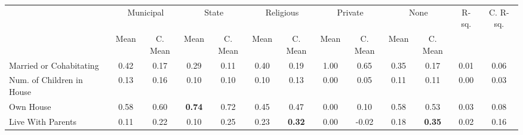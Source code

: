 \begin{tabular}{l c c c c c c c c c c c c}
\toprule
& \multicolumn{2}{c}{Municipal} & \multicolumn{2}{c}{State} & \multicolumn{2}{c}{Religious} & \multicolumn{2}{c}{Private} & \multicolumn{2}{c}{None} & R-sq. & C. R-sq. \\
& \scriptsize Mean & \scriptsize C. Mean & \scriptsize Mean & \scriptsize C. Mean & \scriptsize Mean & \scriptsize C. Mean & \scriptsize Mean & \scriptsize C. Mean & \scriptsize Mean & \scriptsize C. Mean & & \\
\midrule
Married or Cohabitating &      0.42 & 0.17 &      0.29 & 0.11 &      0.40 & 0.19 &      1.00 & 0.65 &      0.35 & 0.17 &      0.01 &      0.06 \\
Num. of Children in House &      0.13 & 0.16 &      0.10 & 0.10 &      0.10 & 0.13 &      0.00 & 0.05 &      0.11 & 0.11 &      0.00 &      0.03 \\
Own House &      0.58 & 0.60 & \textbf{     0.74} & 0.72 &      0.45 & 0.47 &      0.00 & 0.10 &      0.58 & 0.53 &      0.03 &      0.08 \\
Live With Parents &      0.11 & 0.22 &      0.10 & 0.25 &      0.23 & \textbf{     0.32} &      0.00 & -0.02 &      0.18 & \textbf{     0.35} &      0.02 &      0.16 \\
\bottomrule
\end{tabular}
